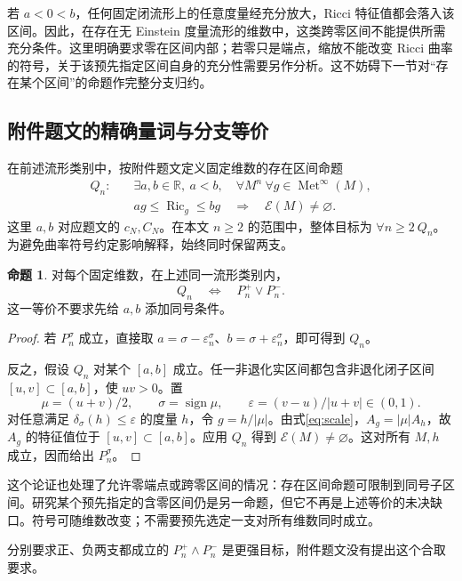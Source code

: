 \documentclass[11pt,a4paper]{article}
\theoremstyle{definition}
\newtheorem{proposition}[definition]{命题}
\newcommand{\Ric}{\operatorname{Ric}}
\newcommand{\Met}{\operatorname{Met}}
\newcommand{\Ein}{\mathcal E}
\begin{document}
若 $a<0<b$，任何固定闭流形上的任意度量经充分放大，Ricci 特征值都会落入该区间。因此，在存在无 Einstein 度量流形的维数中，这类跨零区间不能提供所需充分条件。这里明确要求零在区间内部；若零只是端点，缩放不能改变 Ricci 曲率的符号，关于该预先指定区间自身的充分性需要另作分析。这不妨碍下一节对“存在某个区间”的命题作完整分支归约。

\subsection{附件题文的精确量词与分支等价}

在前述流形类别中，按附件题文定义固定维数的存在区间命题
\begin{equation}\label{eq:Q}
\begin{split}
Q_n:\quad &\exists a,b\in\mathbb R,\ a<b,\quad
\forall M^n\ \forall g\in\Met^\infty(M),\\
&ag\le\Ric_g\le bg\quad\Longrightarrow\quad\Ein(M)\ne\varnothing.
\end{split}
\end{equation}
这里 $a,b$ 对应题文的 $c_N,C_N$。在本文 $n\ge2$ 的范围中，整体目标为 $\forall n\ge2\ Q_n$。为避免曲率符号约定影响解释，始终同时保留两支。

\begin{proposition}\label{prop:branches}
对每个固定维数，在上述同一流形类别内，
\[
Q_n\quad\Longleftrightarrow\quad P_n^+\vee P_n^-.
\]
这一等价不要求先给 $a,b$ 添加同号条件。
\end{proposition}
\begin{proof}
若 $P_n^\sigma$ 成立，直接取 $a=\sigma-\varepsilon_n^\sigma$、$b=\sigma+\varepsilon_n^\sigma$，即可得到 $Q_n$。

反之，假设 $Q_n$ 对某个 $[a,b]$ 成立。任一非退化实区间都包含非退化闭子区间 $[u,v]\subset[a,b]$，使 $uv>0$。置
\[
\mu=(u+v)/2,\qquad \sigma=\operatorname{sign}\mu,\qquad
\varepsilon=(v-u)/|u+v|\in(0,1).
\]
对任意满足 $\delta_\sigma(h)\le\varepsilon$ 的度量 $h$，令 $g=h/|\mu|$。由式\eqref{eq:scale}，$A_g=|\mu|A_h$，故 $A_g$ 的特征值位于 $[u,v]\subset[a,b]$。应用 $Q_n$ 得到 $\Ein(M)\ne\varnothing$。这对所有 $M,h$ 成立，因而给出 $P_n^\sigma$。
\end{proof}

这个论证也处理了允许零端点或跨零区间的情况：存在区间命题可限制到同号子区间。研究某个预先指定的含零区间仍是另一命题，但它不再是上述等价的未决缺口。符号可随维数改变；不需要预先选定一支对所有维数同时成立。

分别要求正、负两支都成立的 $P_n^+\wedge P_n^-$ 是更强目标，附件题文没有提出这个合取要求。
\end{document}
